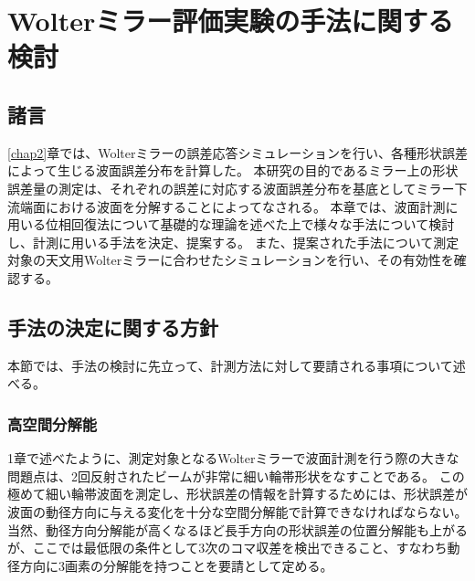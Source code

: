 \chapter{Wolterミラー評価実験の手法に関する検討}
\thispagestyle{empty}
\label{chap3}
\graphicspath{{chap3/figure/}}
\minitoc

\newpage


\section{諸言}
\label{chap3_introduction}

\ref{chap2}章では、Wolterミラーの誤差応答シミュレーションを行い、各種形状誤差によって生じる波面誤差分布を計算した。
本研究の目的であるミラー上の形状誤差量の測定は、それぞれの誤差に対応する波面誤差分布を基底としてミラー下流端面における波面を分解することによってなされる。
本章では、波面計測に用いる位相回復法について基礎的な理論を述べた上で様々な手法について検討し、計測に用いる手法を決定、提案する。
また、提案された手法について測定対象の天文用Wolterミラーに合わせたシミュレーションを行い、その有効性を確認する。

\clearpage
\newpage

\section{手法の決定に関する方針}
\label{chap3_method_choice_policy}

本節では、手法の検討に先立って、計測方法に対して要請される事項について述べる。

\subsection{高空間分解能}
\label{chap3_high_spatial_resolution}
1章で述べたように、測定対象となるWolterミラーで波面計測を行う際の大きな問題点は、2回反射されたビームが非常に細い輪帯形状をなすことである。
この極めて細い輪帯波面を測定し、形状誤差の情報を計算するためには、形状誤差が波面の動径方向に与える変化を十分な空間分解能で計算できなければならない。
当然、動径方向分解能が高くなるほど長手方向の形状誤差の位置分解能も上がるが、ここでは最低限の条件として3次のコマ収差を検出できること、すなわち動径方向に3画素の分解能を持つことを要請として定める。

